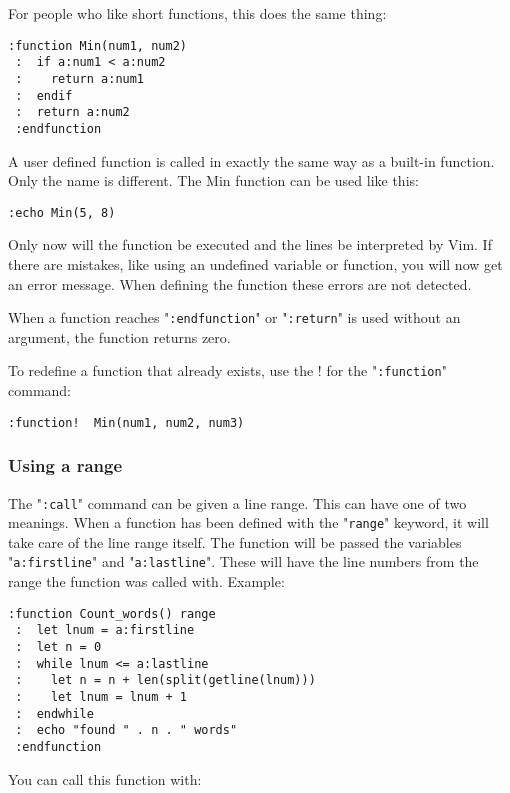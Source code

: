 For people who like short functions, this does the same thing:

\begin{Verbatim}[samepage=true]
 :function Min(num1, num2)
 :  if a:num1 < a:num2
 :    return a:num1
 :  endif
 :  return a:num2
 :endfunction
\end{Verbatim}

A user defined function is called in exactly the same way as a built-in function.
Only the name is different.
The Min function can be used like this:

\begin{Verbatim}[samepage=true]
 :echo Min(5, 8)
\end{Verbatim}

Only now will the function be executed and the lines be interpreted by Vim.
If there are mistakes, like using an undefined variable or function, you will now get an error message.
When defining the function these errors are not detected.

When a function reaches "\texttt{:endfunction}" or "\texttt{:return}" is used without an argument, the function returns zero.

To redefine a function that already exists, use the ! for the "\texttt{:function}" command:

\begin{Verbatim}[samepage=true]
 :function!  Min(num1, num2, num3)
\end{Verbatim}

\subsubsection{Using a range}
The "\texttt{:call}" command can be given a line range.
This can have one of two meanings.
When a function has been defined with the "\texttt{range}" keyword, it will take care of the line range itself.
The function will be passed the variables "\texttt{a:firstline}" and "\texttt{a:lastline}".
These will have the line numbers from the range the function was called with.
Example:

\begin{Verbatim}[samepage=true]
 :function Count_words() range
 :  let lnum = a:firstline
 :  let n = 0
 :  while lnum <= a:lastline
 :    let n = n + len(split(getline(lnum)))
 :    let lnum = lnum + 1
 :  endwhile
 :  echo "found " . n . " words"
 :endfunction
\end{Verbatim}

You can call this function with:

